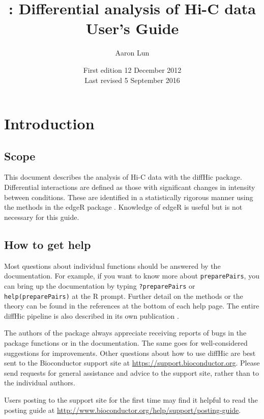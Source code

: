 \documentclass[12pt]{report}
\title{\pkgname{}: Differential analysis of Hi-C data \\ \vspace{0.2in} User's Guide}
\author{Aaron Lun}
\date{First edition 12 December 2012\\
\vspace{6pt}
Last revised 5 September 2016}
\newcommand{\edgeR}{edgeR}
\newcommand{\pkgname}{diffHic}
\newcommand{\code}[1]{{\small\texttt{#1}}}
\newcommand{\R}{\textsf{R}}
\begin{document}
\maketitle
\tableofcontents


\newpage

\chapter{Introduction}
\section{Scope}
This document describes the analysis of Hi-C data with the \pkgname{} package.
Differential interactions are defined as those with significant changes in intensity between conditions.
These are identified in a statistically rigorous manner using the methods in the \edgeR{} package \citep{edgeR}.
Knowledge of \edgeR{} is useful but is not necessary for this guide.

\section{How to get help}
Most questions about individual functions should be answered by the documentation.
For example, if you want to know more about \code{preparePairs}, you can bring up the documentation by typing \code{?preparePairs} or \code{help(preparePairs)} at the \R{} prompt.
Further detail on the methods or the theory can be found in the references at the bottom of each help page.
The entire \pkgname{} pipeline is also described in its own publication \citep{lun2015diffhic}.

The authors of the package always appreciate receiving reports of bugs in the package functions or in the documentation. 
The same goes for well-considered suggestions for improvements. 
Other questions about how to use \pkgname{} are best sent to the Bioconductor support site at \url{https://support.bioconductor.org}.
Please send requests for general assistance and advice to the support site, rather than to the individual authors. 

Users posting to the support site for the first time may find it helpful to read the posting guide at \url{http://www.bioconductor.org/help/support/posting-guide}.
\end{document}
